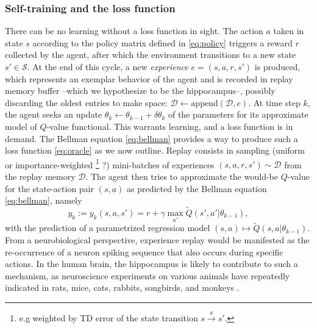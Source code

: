 \documentclass[10pt,letterpaper]{article}
\begin{document}
  \subsubsection{Self-training and the loss function}
There can be no learning without a loss function in sight.
The action $a$ taken in state $s$ according to the policy matrix defined in
\eqref{eq:policy} triggers a reward $r$ collected by the agent,
after which the environment transitions to a new state $s' \in \mathcal S$.
At the end of this cycle, a new \textit{experience} $e = (s,a,r,s')$ is produced, which represents an exemplar
behavior of the agent and is recorded in replay memory buffer --which we hypothesize to be the
hippocampus--, possibly discarding the oldest entries to make space:
$\mathcal D \leftarrow \text{append}(\mathcal D, e)$.
At time step $k$, the agent seeks an update $\theta_{k} \leftarrow \theta_{k-1} + \delta \theta_{k}$ of the parameters for its approximate model of $Q$-value functional. This warrants learning,
and a loss function is in demand.
The Bellman equation \eqref{eq:bellman} provides a way to produce such a loss function \eqref{eq:oracle} as we now outline.
Replay consists in sampling (uniform or importance-weighted
\footnote{e.g weighted by TD error of the state transition $s \overset{a}{\rightarrow} s'$.} ?)  mini-batches of experiences
$(s, a, r, s') \sim \mathcal D$ from the replay memory $\mathcal D$.
The agent then tries to approximate
the would-be $Q$-value for the state-action pair $(s,a)$ as predicted by the Bellman equation \eqref{eq:bellman}, namely
\begin{equation}
  y_k := y_k(s,a,s') =  r + \gamma \max_{a'} \tilde{Q}(s', a'|\theta_{k-1}),
\end{equation}
with the prediction of a parametrized regression model $(s,a)
\mapsto \tilde{Q}(s, a|\theta_{k-1})$.
From a neurobiological perspective,
experience replay would be manifested as the re-occurrence of a
neuron spiking sequence that also occurs during specific actions.
In the human brain, the hippocampus is likely to contribute to such a mechanism,
as neuroscience experiments on various animals have repeatedly indicated
in rats, mice, cats, rabbits, songbirds, and
monkeys \citep{buhry2011,nokia2010,dave2000,skaggs2007}.
\end{document}
